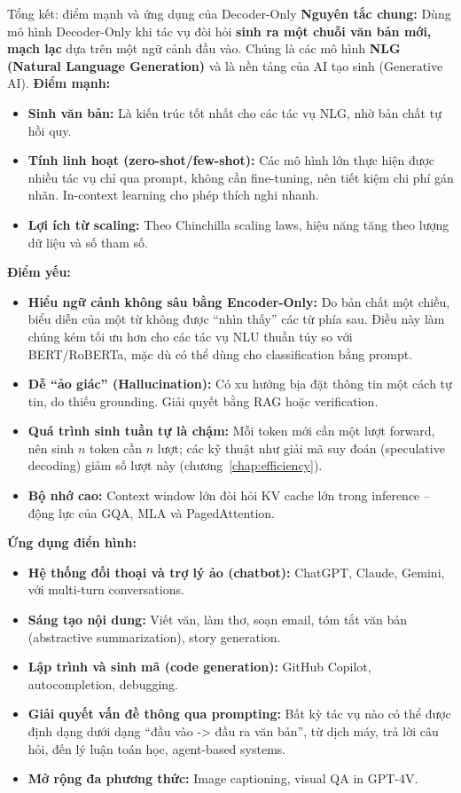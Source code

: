 \begin{assess}{Tổng kết: điểm mạnh và ứng dụng của Decoder-Only}
	\textbf{Nguyên tắc chung:} Dùng mô hình Decoder-Only khi tác vụ đòi hỏi \textbf{sinh ra một chuỗi văn bản mới, mạch lạc} dựa trên một ngữ cảnh đầu vào. Chúng là các mô hình \textbf{NLG (Natural Language Generation)} và là nền tảng của AI tạo sinh (Generative AI).
	\textbf{Điểm mạnh:}
	\begin{itemize}
		\item \textbf{Sinh văn bản:} Là kiến trúc tốt nhất cho các tác vụ NLG, nhờ bản chất tự hồi quy.
		\item \textbf{Tính linh hoạt (zero-shot/few-shot):} Các mô hình lớn thực hiện được nhiều tác vụ chỉ qua prompt, không cần fine-tuning, nên tiết kiệm chi phí gán nhãn. In-context learning cho phép thích nghi nhanh.
		\item \textbf{Lợi ích từ scaling:} Theo Chinchilla scaling laws, hiệu năng tăng theo lượng dữ liệu và số tham số.
	\end{itemize}
	\textbf{Điểm yếu:}
	\begin{itemize}
		\item \textbf{Hiểu ngữ cảnh không sâu bằng Encoder-Only:} Do bản chất một chiều, biểu diễn của một từ không được “nhìn thấy” các từ phía sau. Điều này làm chúng kém tối ưu hơn cho các tác vụ NLU thuần túy so với BERT/RoBERTa, mặc dù có thể dùng cho classification bằng prompt.
		\item \textbf{Dễ “ảo giác” (Hallucination):} Có xu hướng bịa đặt thông tin một cách tự tin, do thiếu grounding. Giải quyết bằng RAG hoặc verification.
		\item \textbf{Quá trình sinh tuần tự là chậm:} Mỗi token mới cần một lượt forward, nên sinh $n$ token cần $n$ lượt; các kỹ thuật như giải mã suy đoán (speculative decoding) giảm số lượt này (chương~\ref{chap:efficiency}).
		\item \textbf{Bộ nhớ cao:} Context window lớn đòi hỏi KV cache lớn trong inference -- động lực của GQA, MLA và PagedAttention.
	\end{itemize}
	\textbf{Ứng dụng điển hình:}
	\begin{itemize}
		\item \textbf{Hệ thống đối thoại và trợ lý ảo (chatbot):} ChatGPT, Claude, Gemini, với multi-turn conversations.
		\item \textbf{Sáng tạo nội dung:} Viết văn, làm thơ, soạn email, tóm tắt văn bản (abstractive summarization), story generation.
		\item \textbf{Lập trình và sinh mã (code generation):} GitHub Copilot, autocompletion, debugging.
		\item \textbf{Giải quyết vấn đề thông qua prompting:} Bất kỳ tác vụ nào có thể được định dạng dưới dạng “đầu vào -> đầu ra văn bản”, từ dịch máy, trả lời câu hỏi, đến lý luận toán học, agent-based systems.
		\item \textbf{Mở rộng đa phương thức:} Image captioning, visual QA in GPT-4V.
	\end{itemize}
\end{assess}

